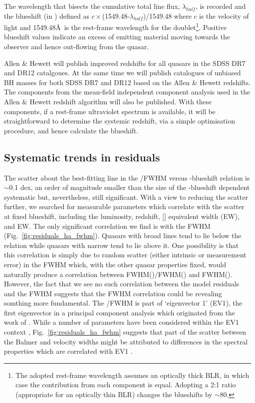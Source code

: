 The wavelength that bisects the cumulative total line flux, $\lambda_{half}$, is recorded and the blueshift (in \kms) defined as $c\times$(1549.48-$\lambda_{half}$)/1549.48 where $c$ is the velocity of light and 1549.48\AA \ is the rest-frame wavelength for the  doublet\footnote{The adopted  rest-frame wavelength assumes an optically thick BLR, in which case the contribution from each component is equal. Adopting a 2:1 ratio (appropriate for an optically thin BLR) changes the blueshifts by $\sim$80\kms.}. 
Positive blueshift values indicate an excess of emitting material moving towards the observer and hence out-flowing from the quasar.

Allen \& Hewett will publish improved redshifts for all quasars in the SDSS DR7 and DR12 catalgoues. 
At the same time we will publish catalogues of unbiased BH masses for both SDSS DR7 and DR12 based on the Allen \& Hewett redshifts. 
The components from the mean-field independent component analysis \citep[see][for an application to astronomical spectra]{allen13} used in the Allen \& Hewett redshift algorithm will also be published.
With these components, if a rest-frame ultraviolet spectrum is available, it will be straightforward to determine the systemic redshift, via a simple optimisation procedure, and hence calculate the  blueshift. 

\subsection{Systematic trends in residuals}

The scatter about the best-fitting line in the /\ha FWHM versus -blueshift relation is $\sim$0.1 dex, an order of magnitude smaller than the size of the -blueshift dependent systematic but, nevertheless, still significant.
With a view to reducing the scatter further, we searched for measurable parameters which correlate with the scatter at fixed  blueshift, including the luminosity, redshift, [] equivalent width (EW), and  EW.
The only significant correlation we find is with the \ha FWHM (Fig.~\ref{fig:residuals_ha_fwhm}).
Quasars with broad \ha lines tend to lie below the relation while quasars with narrow \ha tend to lie above it.
One possibility is that this correlation is simply due to random scatter (either intrinsic or measurement error) in the \ha FWHM which, with the other quasar properties fixed, would naturally produce a correlation between FWHM()/FWHM(\hans) and FWHM(\hans).
However, the fact that we see no such correlation between the model residuals and the  FWHM suggests that the \ha FWHM correlation could be revealing somthing more fundamental. 
The \hans/\hb FWHM is part of `eigenvector 1' (EV1), the first eigenvector in a principal component analysis which originated from the work of \citet{boroson92}.    
While a number of parameters have been considered within the EV1 context \citep[e.g.][]{brotherton99},
Fig.~\ref{fig:residuals_ha_fwhm} suggests that part of the scatter between the Balmer and  velocity widths might be attributed to differences in the spectral properties which are correlated with EV1 \citep{marziani13}. 



